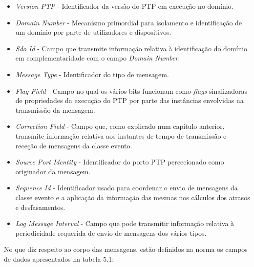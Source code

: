 \begin{itemize}
  
  \item \textit{Version PTP}  - \quad Identificador da versão do PTP em execução no domínio. 
  \item \textit{\textit{Domain Number}} - \quad Mecanismo primordial para isolamento e identificação de um domínio por parte de utilizadores e dispositivos.
  \item \textit{\textit{Sdo Id}}  - \quad Campo que transmite informação relativa à identificação do domínio em complementaridade com o campo \textit{Domain Number}.
  \item \textit{Message Type} - \quad Identificador do tipo de mensagem.
  \item \textit{Flag Field}  - \quad Campo no qual os vários bits funcionam como \textit{flags} sinalizadoras de propriedades da execução do PTP por parte das instâncias envolvidas na transmissão da mensagem.
  \item \textit{Correction Field}  - \quad Campo que, como explicado num capítulo anterior, transmite informação relativa aos instantes de tempo de transmissão e receção de mensagens da classe evento.
  \item \textit{Source Port Identity} - \quad Identificador do porto PTP percecionado como originador da mensagem.
  \item \textit{Sequence Id}  - \quad Identificador usado para coordenar o envio de mensagens da classe evento e a aplicação da informação das mesmas nos cálculos dos atrasos e desfasamentos. 
  \item \textit{Log Message Interval}  - \quad Campo que pode transmitir informação relativa à periodicidade requerida de envio de mensagens dos vários tipos.
\end{itemize}

No que diz respeito ao corpo das mensagens, estão definidos na norma os campos de dados apresentados na tabela 5.1:


